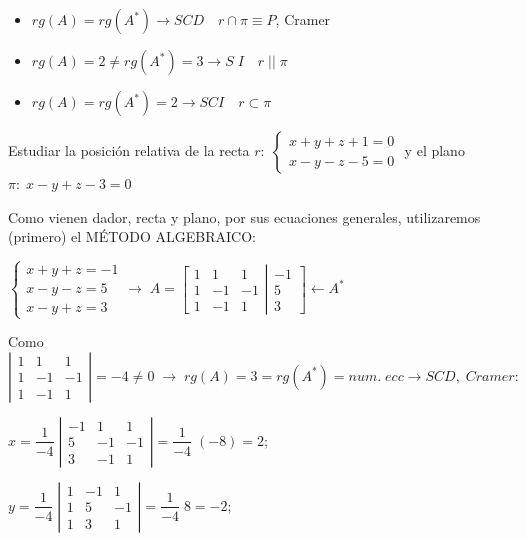 \begin{itemize}
\item	$rg(A)=rg(A^*) \to SCD \quad  r\cap \pi \equiv P$, Cramer
\item $rg(A)=2\neq rg(A^*)=3 \to S\;I \quad r\;||\; \pi$
\item $rg(A)=rg(A^*)=2 \to SCI \quad r \subset \pi$
\end{itemize}

\begin{ejem}
Estudiar la posición relativa de la recta $r:\;\begin{cases} x+y+z+1=0 \\ x-y-z-5=0 \end{cases}$ y el plano $\pi:\; x-y+z-3=0$	
\end{ejem}

\noindent Como vienen dador, recta y plano, por sus ecuaciones generales, utilizaremos (primero) el MÉTODO ALGEBRAICO:

\noindent $\begin{cases} x+y+z=-1 \\ x-y-z=5 \\  x-y+z=3 \end{cases} \to \;A= \left[ \begin{matrix} 1&1&1 \\ 1&-1&-1 \\ 1&-1&1 \end{matrix} \right| \left. \begin{matrix} -1\\5\\3 \end{matrix} \right] \leftarrow A^*$

\noindent Como $\left| \begin{matrix} 1&1&1 \\ 1&-1&-1 \\ 1&-1&1 \end{matrix} \right|=-4\neq 0 \; \to \; rg(A)=3=rg(A^*)=num.\; ecc \to SCD,\; Cramer:$

\noindent $x=\dfrac 1 {-4} \; \left| \begin{matrix} -1&1&1 \\ 5&-1&-1 \\ 3&-1&1 \end{matrix} \right|=\dfrac 1 {-4} \; (-8)=2;\;\; $ 

\noindent $y=\dfrac 1 {-4} \; \left| \begin{matrix} 1&-1&1 \\ 1&5&-1 \\ 1&3&1 \end{matrix}  \right|=\dfrac 1 {-4} \; 8=-2;\;\; $

